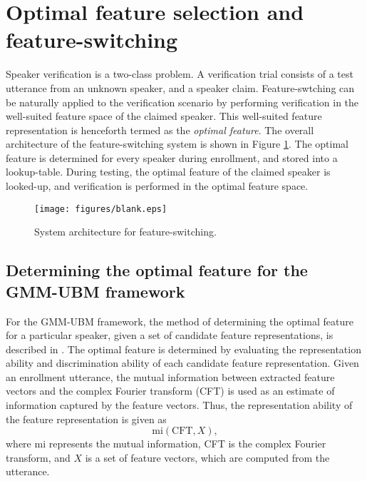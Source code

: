 \documentclass{article}
\begin{document}
\section{Optimal feature selection and feature-switching}

Speaker verification is a two-class problem. A verification trial consists of a
test utterance from an unknown speaker, and a speaker claim. Feature-swtching
can be naturally applied to the verification scenario by performing
verification in the well-suited feature space of the claimed speaker. This
well-suited feature representation is henceforth termed as the \emph{optimal
feature}. The overall architecture of the feature-switching system is shown in
Figure \ref{fig:systemArch}. The optimal feature is determined for every speaker
during enrollment, and stored into a lookup-table. During testing, the optimal
feature of the claimed speaker is looked-up, and verification is performed in
the optimal feature space.

\begin{figure}[th]
\centering
\texttt{[image: figures/blank.eps]}
\caption{System architecture for feature-switching.}
\label{fig:systemArch}
\end{figure}



\subsection{Determining the optimal feature for the GMM-UBM framework}

For the GMM-UBM framework, the method of determining the optimal feature for a
particular speaker, given a set of candidate feature representations, is
described in \cite{padmanInterspeech2010}. The optimal feature is determined by
evaluating the representation ability and discrimination ability
of each candidate feature representation. Given an enrollment utterance, the mutual information
between extracted feature vectors and the complex Fourier transform (CFT) is used as an
estimate of information captured by the feature vectors. Thus, the
representation ability of the feature representation is given as
\begin{equation}
\textrm{mi}(\textrm{CFT},X),
\end{equation}
where $\textrm{mi}$ represents the mutual information, CFT is the complex
Fourier transform, and $X$ is a set of feature vectors, which are computed from
the utterance.
\end{document}

